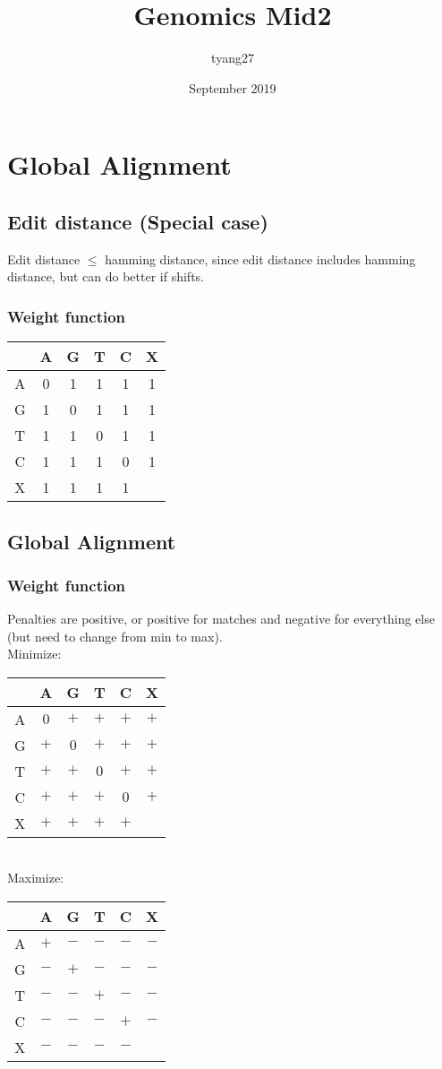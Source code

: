 \documentclass{article}
\title{Genomics Mid2}
\author{tyang27}
\date{September 2019}
\begin{document}
\maketitle

\section{Global Alignment}
\subsection*{Edit distance (Special case)}
Edit distance $\leq$ hamming distance, since edit distance includes hamming distance, but can do better if shifts.
\subsubsection*{Weight function}
\begin{tabular}{c|c c c c c}
     & A & G & T & C & X\\
     \hline
    A & 0 & 1 & 1 & 1 & 1 \\
    G & 1 & 0 & 1 & 1 & 1 \\
    T & 1 & 1 & 0 & 1 & 1 \\
    C & 1 & 1 & 1 & 0 & 1 \\
    X & 1 & 1 & 1 & 1 & \\
\end{tabular}

\subsection*{Global Alignment}
\subsubsection*{Weight function}
Penalties are positive, or positive for matches and negative for everything else (but need to change from min to max).\\
Minimize:\\
\begin{tabular}{c|c c c c c}
     & A & G & T & C & X\\
     \hline
    A & $0$ & $+$ & $+$ & $+$ & $+$ \\
    G & $+$ & $0$ & $+$ & $+$ & $+$ \\
    T & $+$ & $+$ & $0$ & $+$ & $+$ \\
    C & $+$ & $+$ & $+$ & $0$ & $+$ \\
    X & $+$ & $+$ & $+$ & $+$ & \\
\end{tabular}\\
Maximize:\\
\begin{tabular}{c|c c c c c}
     & A & G & T & C & X\\
     \hline
    A & $+$ & $-$ & $-$ & $-$ & $-$ \\
    G & $-$ & $+$ & $-$ & $-$ & $-$ \\
    T & $-$ & $-$ & $+$ & $-$ & $-$ \\
    C & $-$ & $-$ & $-$ & $+$ & $-$ \\
    X & $-$ & $-$ & $-$ & $-$ & \\
\end{tabular}
\end{document}
